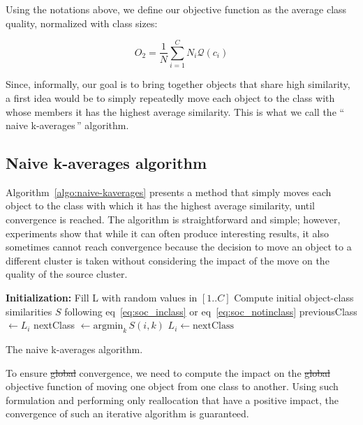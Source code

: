 \documentclass[natbib,smallextended]{svjour3}
\newcommand{\gl}[1]{``\,#1\,''} %
\providecommand{\DIFdeltex}[1]{{\protect\color{red}\sout{#1}}}                      %
\providecommand{\DIFdelbegin}{} %
\providecommand{\DIFdelend}{} %
\providecommand{\DIFdel}[1]{\texorpdfstring{\DIFdeltex{#1}}{}} %
\newcommand{\DIFscaledelfig}{0.5}
\newlength{\DIFdelgraphicswidth} %
\newlength{\DIFdelgraphicsheight} %
\newcommand{\DIFdelincludegraphics}[2][]{%
\sbox{\DIFdelgraphicsbox}{\DIFOincludegraphics[#1]{#2}}%
\settoboxwidth{\DIFdelgraphicswidth}{\DIFdelgraphicsbox} %
\settoboxtotalheight{\DIFdelgraphicsheight}{\DIFdelgraphicsbox} %
\scalebox{\DIFscaledelfig}{%
\parbox[b]{\DIFdelgraphicswidth}{\usebox{\DIFdelgraphicsbox}\\[-\baselineskip] \rule{\DIFdelgraphicswidth}{0em}}\llap{\resizebox{\DIFdelgraphicswidth}{\DIFdelgraphicsheight}{%
\setlength{\unitlength}{\DIFdelgraphicswidth}%
\begin{picture}(1,1)%
\thicklines\linethickness{2pt} %
{\color[rgb]{1,0,0}\put(0,0){\framebox(1,1){}}}%
{\color[rgb]{1,0,0}\put(0,0){\line( 1,1){1}}}%
{\color[rgb]{1,0,0}\put(0,1){\line(1,-1){1}}}%
\end{picture}%
}\hspace*{3pt}}} %
} %
\DeclareRobustCommand{\DIFdelbegin}{\DIFOdelbegin \let\includegraphics\DIFdelincludegraphics} %
\DeclareRobustCommand{\DIFdelend}{\DIFOaddend \let\includegraphics\DIFOincludegraphics} %
\begin{document}
\DIFdelend Using the notations above, we define our objective function as the average class quality, normalized with class sizes:

\[
O_2 = \frac{1}{N} \sum_{i=1}^{C} N_i \mathcal{Q}(c_i)
\]

Since, informally, our goal is to bring together objects that share high similarity, a first idea would be to simply repeatedly move each object to the class with whose members it has the highest average similarity. This is what we call the \gl{naive k-averages} algorithm.

\subsection{Naive k-averages algorithm}

Algorithm~\ref{algo:naive-kaverages} presents a method that simply moves each object to the class with which it has the highest average similarity, until convergence is reached. The algorithm is straightforward and simple; however, experiments show that while it can often produce interesting results, it also sometimes cannot reach convergence because the decision to move an object to a different cluster is taken without considering the impact of the move on the quality of the source cluster.

\begin{algorithm}
	\label{algo:naive-kaverages}
	\SetAlgoLined
	\BlankLine
	\textbf{Initialization:}
		Fill L with random values in $[1..C]$\;
		Compute initial object-class similarities $S$ following eq~\ref{eq:soc_inclass} or eq~\ref{eq:soc_notinclass}\;
	\BlankLine
	 {
		 {
			previousClass $\leftarrow L_i$\;
			nextClass $\leftarrow \mathrm{argmin}_k\, S(i, k)$
			 {
				$L_i \leftarrow \mathrm{nextClass}$\;
			}
		}
	}
	\BlankLine
	\caption{The naive k-averages algorithm.}
\end{algorithm}

To ensure \DIFdelbegin \DIFdel{global }\DIFdelend convergence, we need to compute the impact on the \DIFdelbegin \DIFdel{global }\DIFdelend objective function of moving one object from one class to another. Using such formulation and performing only reallocation that have a positive impact, the convergence of such an iterative algorithm is guaranteed.
\end{document}
